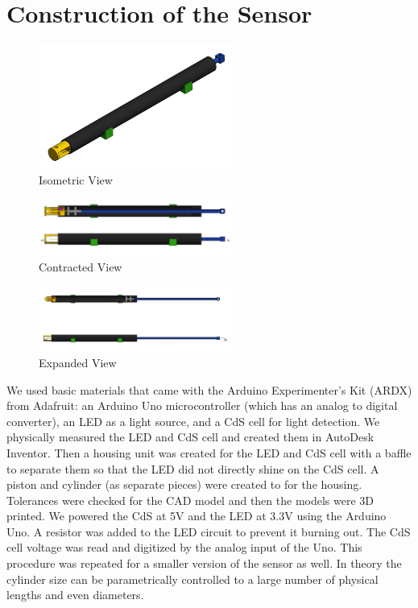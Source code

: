 \documentclass[10pt,conference,compsocconf]{IEEEtran}
\begin{document}
\section{Construction of the Sensor}

\begin{figure}
  \centering
  \includegraphics[width=2.5in]{figures/IsometricView.png}
  \caption{Isometric View}  
\end{figure}

\begin{figure}
  \centering
  \includegraphics[width=2.5in]{figures/Contracted.png}
  \caption{Contracted View}  
\end{figure}

\begin{figure}
  \centering
  \includegraphics[width=2.5in]{figures/Expanded.png}
  \caption{Expanded View}  
\end{figure}

We used basic materials that came with the Arduino Experimenter’s Kit (ARDX)
from Adafruit\cite{ARDX}: an Arduino Uno microcontroller (which has an  analog to digital
converter), an LED as a light source, and a CdS cell for light
detection.
We physically measured the LED and CdS cell
and created them in AutoDesk Inventor.
Then a housing unit was created for
the LED and CdS cell with a baffle to separate them so that the LED
did not directly shine on the CdS cell. A piston and cylinder (as separate pieces)
were created to for the housing. Tolerances were checked for the CAD model
and then the models were 3D printed. We powered the CdS at 5V and the
LED at 3.3V using the Arduino Uno. A resistor was added to the LED
circuit to prevent it burning out. The CdS cell voltage was read and digitized
by the analog input of the Uno. This procedure was repeated for a
smaller version of the sensor as well. In theory the cylinder size can
be parametrically controlled to a large number of physical lengths and
even diameters.
\end{document}
